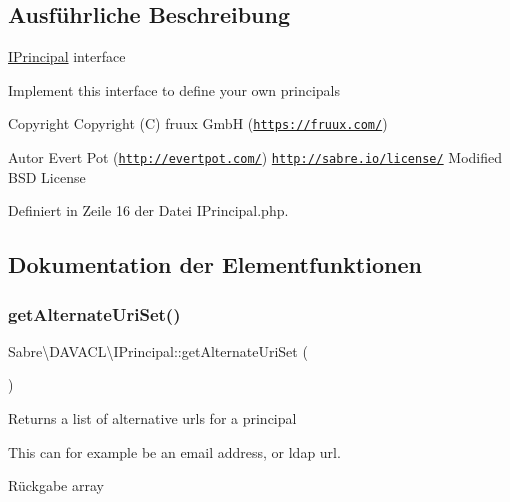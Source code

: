 \subsection{Ausführliche Beschreibung}
\mbox{\hyperlink{interface_sabre_1_1_d_a_v_a_c_l_1_1_i_principal}{I\+Principal}} interface

Implement this interface to define your own principals

\begin{DoxyCopyright}{Copyright}
Copyright (C) fruux GmbH (\href{https://fruux.com/}{\tt https\+://fruux.\+com/}) 
\end{DoxyCopyright}
\begin{DoxyAuthor}{Autor}
Evert Pot (\href{http://evertpot.com/}{\tt http\+://evertpot.\+com/})  \href{http://sabre.io/license/}{\tt http\+://sabre.\+io/license/} Modified B\+SD License 
\end{DoxyAuthor}


Definiert in Zeile 16 der Datei I\+Principal.\+php.



\subsection{Dokumentation der Elementfunktionen}
\mbox{\label{interface_sabre_1_1_d_a_v_a_c_l_1_1_i_principal_ac28ebb97541a792d73dd4e15d3b8cdb6}} 
\subsubsection{\texorpdfstring{get\+Alternate\+Uri\+Set()}{getAlternateUriSet()}}
{\footnotesize\ttfamily Sabre\textbackslash{}\+D\+A\+V\+A\+C\+L\textbackslash{}\+I\+Principal\+::get\+Alternate\+Uri\+Set (\begin{DoxyParamCaption}{ }\end{DoxyParamCaption})}

Returns a list of alternative urls for a principal

This can for example be an email address, or ldap url.

\begin{DoxyReturn}{Rückgabe}
array 
\end{DoxyReturn}


